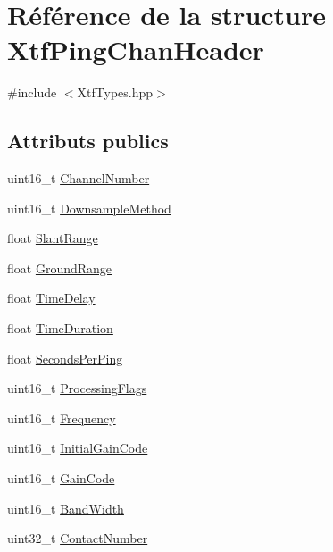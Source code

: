 \hypertarget{structXtfPingChanHeader}{}\section{Référence de la structure Xtf\+Ping\+Chan\+Header}
\label{structXtfPingChanHeader}


{\ttfamily \#include $<$Xtf\+Types.\+hpp$>$}

\subsection*{Attributs publics}
\begin{DoxyCompactItemize}
\item 
uint16\+\_\+t \hyperlink{structXtfPingChanHeader_ab2103654e24128c1f6541de84a8b9fb6}{Channel\+Number}
\item 
uint16\+\_\+t \hyperlink{structXtfPingChanHeader_a882db6e8a67ea919da17d890b2986022}{Downsample\+Method}
\item 
float \hyperlink{structXtfPingChanHeader_ac1fa5b82e755e59106e63cc1151404e4}{Slant\+Range}
\item 
float \hyperlink{structXtfPingChanHeader_a05befa73f6c02c6e7a4b8b647323bc1a}{Ground\+Range}
\item 
float \hyperlink{structXtfPingChanHeader_a667a4f19b2afb8cca48765d4a34d4906}{Time\+Delay}
\item 
float \hyperlink{structXtfPingChanHeader_ac74621607feab6bb035f0593941168d5}{Time\+Duration}
\item 
float \hyperlink{structXtfPingChanHeader_aca227333ab99ec454d585674bf5ef2ab}{Seconds\+Per\+Ping}
\item 
uint16\+\_\+t \hyperlink{structXtfPingChanHeader_a901e35315fbd81de608627ccb1303a6b}{Processing\+Flags}
\item 
uint16\+\_\+t \hyperlink{structXtfPingChanHeader_a13a02d3eef47befb893aa28194388034}{Frequency}
\item 
uint16\+\_\+t \hyperlink{structXtfPingChanHeader_a52b9bb8252b294545cc790e7e3970fd8}{Initial\+Gain\+Code}
\item 
uint16\+\_\+t \hyperlink{structXtfPingChanHeader_aa60ed3a085d6df63e764dcdc8856cf09}{Gain\+Code}
\item 
uint16\+\_\+t \hyperlink{structXtfPingChanHeader_a999a25f718223c0406f897570adb864f}{Band\+Width}
\item 
uint32\+\_\+t \hyperlink{structXtfPingChanHeader_a155ecf1c56f503251d95f5dd518447a3}{Contact\+Number}

\end{DoxyCompactItemize}
